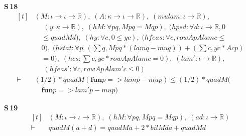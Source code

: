 \noindent\textbf{S\,18}\quad{}
{\footnotesize\[ \begin{aligned}[t]
&(\mathit{M} : \iota \to \iota \to \mathbb{R} ),\; (\mathit{A} : \kappa \to \iota \to \mathbb{R} ),\; (\mathit{mu} \mathit{lam} : \iota \to \mathbb{R} ),\\
&\quad \; (\mathit{y} : \kappa \to \mathbb{R} ),\; (\mathit{hM} : \forall \mathit{p} \mathit{q}, \mathit{M} \mathit{p} \mathit{q} = \mathit{M} \mathit{q} \mathit{p}),\; (\mathit{hpsd} : \forall \mathit{d} : \iota \to \mathbb{R} , 0\\
&\quad \leq \mathit{quad} \mathit{M} \mathit{d}),\; (\mathit{hy} : \forall \mathit{c}, 0 \leq \mathit{y} \mathit{c}),\; (\mathit{hfeas} : \forall \mathit{c}, \mathit{rowAp} \mathit{A} \mathit{lam} \mathit{c} \leq\\
&\quad 0),\; (\mathit{hstat} : \forall \mathit{p}, (\textstyle\sum \mathit{q}, \mathit{M} \mathit{p} \mathit{q} * (\mathit{lam} \mathit{q} - \mathit{mu} \mathit{q})) + (\textstyle\sum \mathit{c}, \mathit{y} \mathit{c} * \mathit{A} \mathit{c} \mathit{p})\\
&\quad = 0),\; (\mathit{hcs} : \textstyle\sum \mathit{c}, \mathit{y} \mathit{c} * \mathit{rowAp} \mathit{A} \mathit{lam} \mathit{c} = 0),\; (\mathit{lam'} : \iota \to \mathbb{R} ),\\
&\quad \; (\mathit{hfeas'} : \forall \mathit{c}, \mathit{rowAp} \mathit{A} \mathit{lam'} \mathit{c} \leq 0)\\
\vdash\;&(1/2) * \mathit{quad} \mathit{M} (\mathbf{fun} \mathit{p} => \mathit{lam} \mathit{p} - \mathit{mu} \mathit{p}) \leq (1/2) * \mathit{quad} \mathit{M} (\\
&\quad \mathbf{fun} \mathit{p} => \mathit{lam'} \mathit{p} - \mathit{mu} \mathit{p})
\end{aligned} \]}

\noindent\textbf{S\,19}\quad{}
{\footnotesize\[ \begin{aligned}[t]
&(\mathit{M} : \iota \to \iota \to \mathbb{R} ),\; (\mathit{hM} : \forall \mathit{p} \mathit{q}, \mathit{M} \mathit{p} \mathit{q} = \mathit{M} \mathit{q} \mathit{p}),\; (\mathit{a} \mathit{d} : \iota \to \mathbb{R} )\\
\vdash\;&\mathit{quad} \mathit{M} (\mathit{a} + \mathit{d}) = \mathit{quad} \mathit{M} \mathit{a} + 2 * \mathit{bil} \mathit{M} \mathit{d} \mathit{a} + \mathit{quad} \mathit{M} \mathit{d}
\end{aligned} \]}

